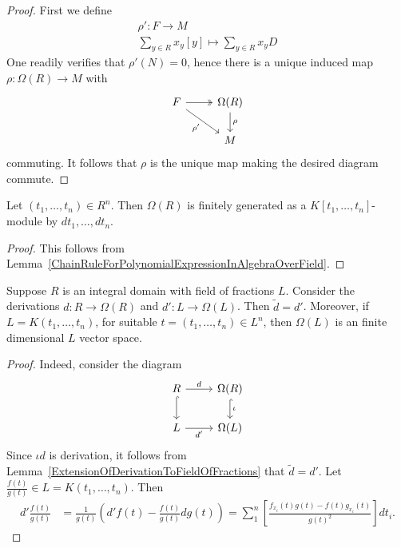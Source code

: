 \begin{proof}
    First we define 
    \begin{gather*}
        \rho' : F \rightarrow M\\
        \sum_{y\in R} x_y[y] \mapsto \sum_{y\in R} x_y D 
    \end{gather*}
    One readily verifies that $\rho'(N)=0$, hence there is a unique induced map $\rho : \Omega(R)\rightarrow M$ with 
    $$
        \begin{tikzcd}
            F \arrow[dr,"\rho'"']\arrow[r,twoheadrightarrow] & \Omega(R)\arrow[d,"\rho"]\\
            & M
        \end{tikzcd}
    $$
    commuting. It follows that $\rho$ is the unique map making the desired diagram commute.
\end{proof}
\begin{lemma}
    Let $(t_1,\dots,t_n)\in R^n$. Then $\Omega(R)$ is finitely generated as a $K[t_1,\dots,t_n]$-module by $dt_1,\dots,dt_n$.  
\end{lemma}
\begin{proof}
    This follows from Lemma~\ref{ChainRuleForPolynomialExpressionInAlgebraOverField}.
\end{proof}
\begin{lemma}
    Suppose $R$ is an integral domain with field of fractions $L$. Consider the derivations $d : R\rightarrow \Omega(R)$ and $d' : L \rightarrow \Omega(L)$. Then $\widetilde{d}=d'$. Moreover, if $L=K(t_1,\dots,t_n)$, for suitable $t=(t_1,\dots,t_n)\in L^n$, then $\Omega(L)$ is an finite dimensional $L$ vector space. 
\end{lemma}
\begin{proof}
    Indeed, consider the diagram
    $$
        \begin{tikzcd}
            R \arrow[d,hookrightarrow]\arrow[r, "d"] & \Omega(R) \arrow[d,hookrightarrow, "\iota"]\\
            L \arrow[r,"d'"'] & \Omega(L)
        \end{tikzcd}
    $$
    Since $\iota d$ is derivation, it follows from Lemma~\ref{ExtensionOfDerivationToFieldOfFractions} that $\widetilde{d}=d'$. Let\\ $\frac{f(t)}{g(t)}\in L=K(t_1,\dots,t_n)$. Then 
    \begin{align*}
        d' \frac{f(t)}{g(t)} &= \frac{1}{g(t)}\left(d' f(t)-\frac{f(t)}{g(t)} dg(t) \right) = \sum_1^n \left[\frac{f_{x_i}(t)g(t)-f(t)g_{x_i}(t)}{g(t)^2}\right] dt_i.
    \end{align*}
\end{proof}